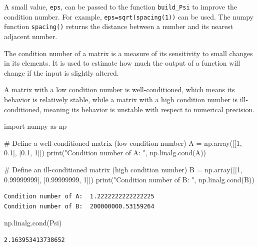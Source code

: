 \documentclass[
  letterpaper,
  DIV=11,
  numbers=noendperiod]{scrreprt}
\newenvironment{Shaded}{\begin{snugshade}}{\end{snugshade}}
\newcommand{\BuiltInTok}[1]{\textcolor[rgb]{0.00,0.23,0.31}{#1}}
\newcommand{\CommentTok}[1]{\textcolor[rgb]{0.37,0.37,0.37}{#1}}
\newcommand{\DecValTok}[1]{\textcolor[rgb]{0.68,0.00,0.00}{#1}}
\newcommand{\FloatTok}[1]{\textcolor[rgb]{0.68,0.00,0.00}{#1}}
\newcommand{\ImportTok}[1]{\textcolor[rgb]{0.00,0.46,0.62}{#1}}
\newcommand{\NormalTok}[1]{\textcolor[rgb]{0.00,0.23,0.31}{#1}}
\newcommand{\OperatorTok}[1]{\textcolor[rgb]{0.37,0.37,0.37}{#1}}
\newcommand{\StringTok}[1]{\textcolor[rgb]{0.13,0.47,0.30}{#1}}
\begin{document}
A small value, \texttt{eps}, can be passed to the function
\texttt{build\_Psi} to improve the condition number. For example,
\texttt{eps=sqrt(spacing(1))} can be used. The numpy function
\texttt{spacing()} returns the distance between a number and its nearest
adjacent number.

The condition number of a matrix is a measure of its sensitivity to
small changes in its elements. It is used to estimate how much the
output of a function will change if the input is slightly altered.

A matrix with a low condition number is well-conditioned, which means
its behavior is relatively stable, while a matrix with a high condition
number is ill-conditioned, meaning its behavior is unstable with respect
to numerical precision.

\begin{Shaded}
\begin{Highlighting}[]
\ImportTok{import}\NormalTok{ numpy }\ImportTok{as}\NormalTok{ np}

\CommentTok{\# Define a well{-}conditioned matrix (low condition number)}
\NormalTok{A }\OperatorTok{=}\NormalTok{ np.array([[}\DecValTok{1}\NormalTok{, }\FloatTok{0.1}\NormalTok{], [}\FloatTok{0.1}\NormalTok{, }\DecValTok{1}\NormalTok{]])}
\BuiltInTok{print}\NormalTok{(}\StringTok{"Condition number of A: "}\NormalTok{, np.linalg.cond(A))}

\CommentTok{\# Define an ill{-}conditioned matrix (high condition number)}
\NormalTok{B }\OperatorTok{=}\NormalTok{ np.array([[}\DecValTok{1}\NormalTok{, }\FloatTok{0.99999999}\NormalTok{], [}\FloatTok{0.99999999}\NormalTok{, }\DecValTok{1}\NormalTok{]])}
\BuiltInTok{print}\NormalTok{(}\StringTok{"Condition number of B: "}\NormalTok{, np.linalg.cond(B))}
\end{Highlighting}
\end{Shaded}

\begin{verbatim}
Condition number of A:  1.2222222222222225
Condition number of B:  200000000.53159264
\end{verbatim}

\begin{Shaded}
\begin{Highlighting}[]
\NormalTok{np.linalg.cond(Psi)}
\end{Highlighting}
\end{Shaded}

\begin{verbatim}
2.163953413738652
\end{verbatim}
\end{document}
